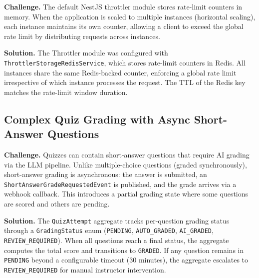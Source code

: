 \textbf{Challenge.} The default NestJS throttler module stores rate-limit counters in memory. When the application is scaled to multiple instances (horizontal scaling), each instance maintains its own counter, allowing a client to exceed the global rate limit by distributing requests across instances.

\textbf{Solution.} The Throttler module was configured with \texttt{ThrottlerStorageRedisService}, which stores rate-limit counters in Redis. All instances share the same Redis-backed counter, enforcing a global rate limit irrespective of which instance processes the request. The TTL of the Redis key matches the rate-limit window duration.

\subsection{Complex Quiz Grading with Async Short-Answer Questions}

\textbf{Challenge.} Quizzes can contain short-answer questions that require AI grading via the LLM pipeline. Unlike multiple-choice questions (graded synchronously), short-answer grading is asynchronous: the answer is submitted, an \texttt{ShortAnswerGradeRequestedEvent} is published, and the grade arrives via a webhook callback. This introduces a partial grading state where some questions are scored and others are pending.

\textbf{Solution.} The \texttt{QuizAttempt} aggregate tracks per-question grading status through a \texttt{GradingStatus} enum (\texttt{PENDING}, \texttt{AUTO\_GRADED}, \texttt{AI\_GRADED}, \texttt{REVIEW\_REQUIRED}). When all questions reach a final status, the aggregate computes the total score and transitions to \texttt{GRADED}. If any question remains in \texttt{PENDING} beyond a configurable timeout (30 minutes), the aggregate escalates to \texttt{REVIEW\_REQUIRED} for manual instructor intervention.
